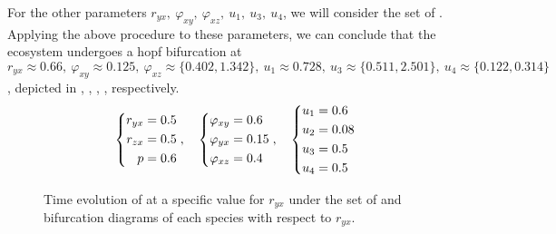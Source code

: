 For the other parameters $r_{yx},\ \varphi_{xy},\ \varphi_{xz},\ u_1,\ u_3,\ u_4$, we will consider the set of .
Applying the above procedure to these parameters, we can conclude that the ecosystem undergoes a hopf bifurcation at $r_{yx}\approx 0.66,\ \varphi_{xy}\approx 0.125,\ \varphi_{xz}\approx\{0.402,1.342\},\ u_1\approx 0.728,\ u_3\approx\{0.511,2.501\},\ u_4\approx\{0.122,0.314\}$, depicted in , , , ,  respectively.
\begin{equation}\label{params:interior-b}
    \begin{dcases}
        \begin{aligned}
            r_{yx} &= 0.5\\
            r_{zx} &= 0.5\\
            p &= 0.6
        \end{aligned}
    \end{dcases},\quad 
    \begin{dcases}
        \begin{aligned}
            \varphi_{xy} &= 0.6\\
            \varphi_{yx} &= 0.15\\
            \varphi_{xz} &= 0.4
        \end{aligned}
    \end{dcases},\quad
    \begin{dcases}
        \begin{aligned}
            u_1 &= 0.6\\
            u_2 &= 0.08\\
            u_3 &= 0.5\\
            u_4 &= 0.5
        \end{aligned}
    \end{dcases}
\end{equation}

\begin{figure}[H]
    \centering
    \hspace{5pt}
    \hspace{5pt}
    \hspace{5pt}
    \caption{Time evolution of  at a specific value for $r_{yx}$ under the set of  and bifurcation diagrams of each species with respect to $r_{yx}$.}
    \label{fig:bifurcation-r_yx}
\end{figure}

